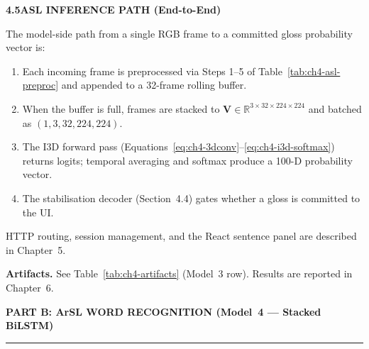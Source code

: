 \noindent\textbf{4.5\quad ASL INFERENCE PATH (End-to-End)}\par
{}
\vspace{0.2cm} %

\noindent The model-side path from a single RGB frame to a committed gloss probability vector is:
\vspace{-0.1cm} %

\begin{enumerate}
\setlength{\itemsep}{0pt} %
\setlength{\parskip}{0pt}
\item Each incoming frame is preprocessed via Steps 1--5 of Table~\ref{tab:ch4-asl-preproc} and appended to a 32-frame rolling buffer.
\item When the buffer is full, frames are stacked to $\mathbf{V} \in \mathbb{R}^{3 \times 32 \times 224 \times 224}$ and batched as $(1,3,32,224,224)$.
\item The I3D forward pass (Equations~\eqref{eq:ch4-3dconv}--\eqref{eq:ch4-i3d-softmax}) returns logits; temporal averaging and softmax produce a 100-D probability vector.
\item The stabilisation decoder (Section~4.4) gates whether a gloss is committed to the UI.
\end{enumerate}
\vspace{0.2cm} %

\enlargethispage{\baselineskip} %

\noindent HTTP routing, session management, and the React sentence panel are described in Chapter~5.\par\vspace{0.15cm} %

\noindent\textbf{Artifacts.} See Table~\ref{tab:ch4-artifacts} (Model~3 row). Results are reported in Chapter~6.\par\vspace{0.3cm} %
\newpage
\vspace*{-0.2cm} %
\begin{center}
\large\textbf{PART B: ArSL WORD RECOGNITION (Model~4 --- Stacked BiLSTM)}
\end{center}
\vspace{0.2cm} %
\noindent\rule{\textwidth}{0.8pt}
\vspace{0.2cm} %

